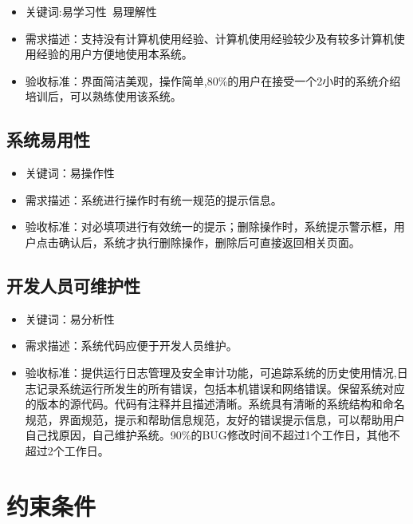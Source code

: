 \documentclass[hyperref, a4paper]{ctexart}
\providecommand{\tightlist}{%
  \setlength{\itemsep}{0pt}\setlength{\parskip}{0pt}}
\begin{document}
\begin{itemize}
\tightlist
\item
  关键词:易学习性~易理解性
\item
  需求描述：支持没有计算机使用经验、计算机使用经验较少及有较多计算机使用经验的用户方便地使用本系统。
\item
  验收标准：界面简洁美观，操作简单,80\%的用户在接受一个2小时的系统介绍培训后，可以熟练使用该系统。
\end{itemize}

\hypertarget{ux7cfbux7edfux6613ux7528ux6027}{%
\subsection{系统易用性}\label{ux7cfbux7edfux6613ux7528ux6027}}

\begin{itemize}
\tightlist
\item
  关键词：易操作性
\item
  需求描述：系统进行操作时有统一规范的提示信息。
\item
  验收标准：对必填项进行有效统一的提示；删除操作时，系统提示警示框，用户点击确认后，系统才执行删除操作，删除后可直接返回相关页面。
\end{itemize}

\hypertarget{ux5f00ux53d1ux4ebaux5458ux53efux7ef4ux62a4ux6027}{%
\subsection{开发人员可维护性}\label{ux5f00ux53d1ux4ebaux5458ux53efux7ef4ux62a4ux6027}}

\begin{itemize}
\tightlist
\item
  关键词：易分析性
\item
  需求描述：系统代码应便于开发人员维护。
\item
  验收标准：提供运行日志管理及安全审计功能，可追踪系统的历史使用情况,日志记录系统运行所发生的所有错误，包括本机错误和网络错误。保留系统对应的版本的源代码。代码有注释并且描述清晰。系统具有清晰的系统结构和命名规范，界面规范，提示和帮助信息规范，友好的错误提示信息，可以帮助用户自己找原因，自己维护系统。90\%的BUG修改时间不超过1个工作日，其他不超过2个工作日。
\end{itemize}

\hypertarget{ux7ea6ux675fux6761ux4ef6}{%
\section{约束条件}\label{ux7ea6ux675fux6761ux4ef6}}
\end{document}
